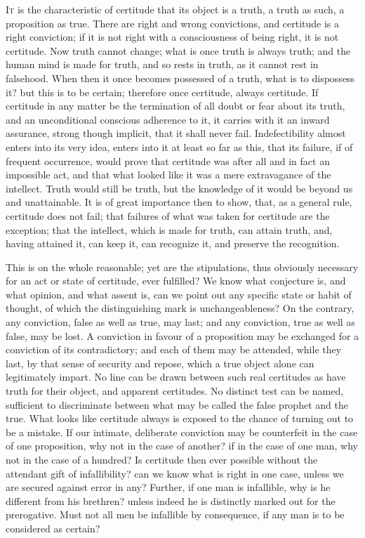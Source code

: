 I\textsc{t} is the characteristic of certitude that its object is a truth, a
truth as such, a proposition as true. There are right and wrong
convictions, and certitude is a right conviction; if it is not right
with a consciousness of being right, it is not certitude. Now truth
cannot change; what is once truth is always truth; and the human mind
is made for truth, and so rests in truth, as it cannot rest in
falsehood. When then it once becomes possessed of a truth, what is to
dispossess it? but this is to be certain; therefore once certitude,
always certitude. If certitude in any matter be the termination of all
doubt or fear about its truth, and an unconditional conscious
adherence to it, it carries with it an inward assurance, strong though
implicit, that it shall never fail. Indefectibility almost enters into
its very idea, enters into it at least so far as this, that its
failure, if of frequent occurrence, would prove that certitude was
after all and in fact an impossible act, and that what looked like it
was a mere extravagance of the intellect. Truth would still be truth,
but the knowledge of it would be beyond us and unattainable. It is of
great importance then to show, that, as a general rule, certitude does
not fail; that failures of what was taken for certitude are the
exception; that the intellect, which is made for truth, can attain
truth, and, having attained it, can keep it, can recognize it, and
preserve the recognition.

This is on the whole reasonable; yet are the stipulations, thus
obviously necessary for an act or state of certitude, ever fulfilled?
We know what conjecture is, and what opinion, and what assent is, can
we point out any specific state or habit of thought, of which the
distinguishing mark is unchangeableness? On the contrary, any
conviction, false as well as true, may last; and any conviction, true
as well as false, may be lost. A conviction in favour of a proposition
may be exchanged for a conviction of its contradictory; and each of
them may be attended, while they last, by that sense of security and
repose, which a true object alone can legitimately impart. No line can
be drawn between such real certitudes as have truth for their object,
and apparent certitudes. No distinct test can be named, sufficient to
discriminate between what may be called the false prophet and the
true. What looks like certitude always is exposed to the chance of
turning out to be a mistake. If our intimate, deliberate conviction
may be counterfeit in the case of one proposition, why not in the case
of another? if in the case of one man, why not in the case of a
hundred? Is certitude then ever possible without the attendant gift of
infallibility? can we know what is right in one case, unless we are
secured against error in any? Further, if one man is infallible, why
is he different from his brethren? unless indeed he is distinctly
marked out for the prerogative. Must not all men be infallible
by consequence, if any man is to be considered as certain?

